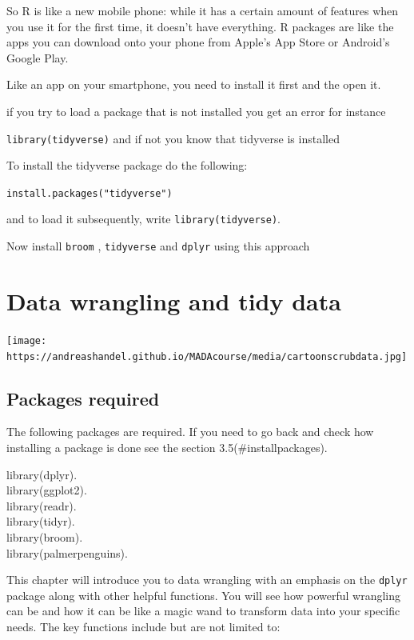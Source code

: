 \documentclass[
]{book}
\begin{document}
So R is like a new mobile phone: while it has a certain amount of
features when you use it for the first time, it doesn't have everything.
R packages are like the apps you can download onto your phone from
Apple's App Store or Android's Google Play.

Like an app on your smartphone, you need to install it first and the
open it.

if you try to load a package that is not installed you get an error for
instance

\texttt{library(tidyverse)} and if not you know that tidyverse is
installed

To install the tidyverse package do the following:

\texttt{install.packages("tidyverse")}

and to load it subsequently, write \texttt{library(tidyverse)}.

Now install \texttt{broom} , \texttt{tidyverse} and \texttt{dplyr} using
this approach

\hypertarget{datawrangling}{%
\chapter{Data wrangling and tidy data}\label{datawrangling}}

\texttt{[image: https://andreashandel.github.io/MADAcourse/media/cartoonscrubdata.jpg]}

\hypertarget{packages-required}{%
\section{Packages required}\label{packages-required}}

The following packages are required. If you need to go back and check
how installing a package is done see the section 3.5(\#installpackages).

library(dplyr).\\
library(ggplot2).\\
library(readr).\\
library(tidyr).\\
library(broom).\\
library(palmerpenguins).

This chapter will introduce you to data wrangling with an emphasis on
the \texttt{dplyr} package along with other helpful functions. You will
see how powerful wrangling can be and how it can be like a magic wand to
transform data into your specific needs. The key functions include but
are not limited to:
\end{document}
